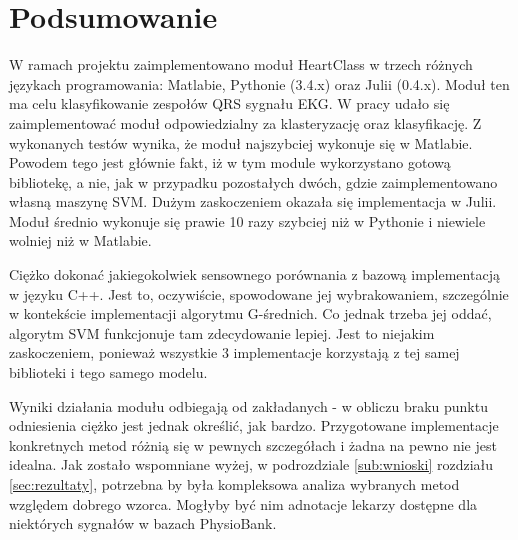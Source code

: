 \section{Podsumowanie}

\qquad W ramach projektu zaimplementowano moduł HeartClass w trzech różnych językach programowania: Matlabie, Pythonie (3.4.x) oraz Julii (0.4.x). Moduł ten ma celu klasyfikowanie zespołów QRS sygnału EKG. W pracy udało się zaimplementować moduł odpowiedzialny za klasteryzację oraz klasyfikację. Z wykonanych testów wynika, że moduł najszybciej wykonuje się w Matlabie. Powodem tego jest głównie fakt, iż w tym module wykorzystano gotową bibliotekę, a nie, jak w przypadku pozostałych dwóch, gdzie zaimplementowano własną maszynę SVM. Dużym zaskoczeniem okazała się implementacja w Julii. Moduł średnio wykonuje się prawie 10 razy szybciej niż w Pythonie i niewiele wolniej niż w Matlabie.

Ciężko dokonać jakiegokolwiek sensownego porównania z bazową implementacją w języku C++. Jest to, oczywiście, spowodowane jej wybrakowaniem, szczególnie w kontekście implementacji algorytmu G-średnich. Co jednak trzeba jej oddać, algorytm SVM funkcjonuje tam zdecydowanie lepiej. Jest to niejakim zaskoczeniem, ponieważ wszystkie 3 implementacje korzystają z tej samej biblioteki i tego samego modelu.

Wyniki działania modułu odbiegają od zakładanych - w obliczu braku punktu odniesienia ciężko jest jednak określić, jak bardzo. Przygotowane implementacje konkretnych metod różnią się w pewnych szczegółach i żadna na pewno nie jest idealna. Jak zostało wspomniane wyżej, w podrozdziale \ref{sub:wnioski} rozdziału \ref{sec:rezultaty}, potrzebna by była kompleksowa analiza wybranych metod względem dobrego wzorca. Mogłyby być nim adnotacje lekarzy dostępne dla niektórych sygnałów w bazach PhysioBank.

